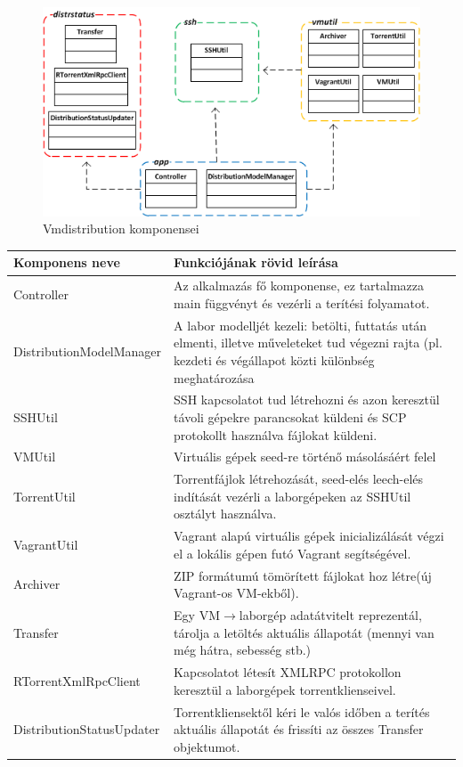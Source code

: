 \begin{figure}[ht]
\centering
\includegraphics[width=150mm, keepaspectratio]{figures/packagediag.png}
\caption{Vmdistribution komponensei}
\label{fig:packagediag}
\end{figure}

\begin{center}
	\begin{tabular}{|>{\centering\arraybackslash}m{45mm}|>{\centering\arraybackslash}m{95mm}|}
		\hline
		\textbf{Komponens neve}&\textbf{Funkciójának rövid leírása}\\
		\hline
		Controller & Az alkalmazás fő komponense, ez tartalmazza main függvényt és vezérli a terítési folyamatot.\\ 
		\hline
		DistributionModelManager & A labor modelljét kezeli: betölti, futtatás után elmenti, illetve műveleteket tud végezni rajta (pl. kezdeti és végállapot közti különbség meghatározása\\
		\hline
		\hline
		SSHUtil & SSH kapcsolatot tud létrehozni és azon keresztül távoli gépekre parancsokat küldeni és SCP protokollt használva fájlokat küldeni.\\
		\hline
		\hline
		VMUtil &  Virtuális gépek seed-re történő másolásáért felel\\
		\hline
		TorrentUtil &Torrentfájlok létrehozását, seed-elés leech-elés indítását vezérli a laborgépeken az SSHUtil osztályt használva. \\
		\hline
		VagrantUtil & Vagrant alapú virtuális gépek inicializálását végzi el a lokális gépen futó Vagrant segítségével.\\
		\hline
		Archiver & ZIP formátumú tömörített fájlokat hoz létre(új Vagrant-os VM-ekből).\\
		\hline
		\hline
		Transfer & Egy VM$\rightarrow$laborgép adatátvitelt reprezentál, tárolja a letöltés aktuális állapotát (mennyi van még hátra, sebesség stb.)\\
		\hline
		RTorrentXmlRpcClient & Kapcsolatot létesít XMLRPC protokollon keresztül a laborgépek torrentklienseivel.\\
		\hline
		DistributionStatusUpdater & Torrentkliensektől kéri le valós időben a terítés aktuális állapotát és frissíti az összes Transfer objektumot.\\
		\hline
	\end{tabular}
\end{center}

